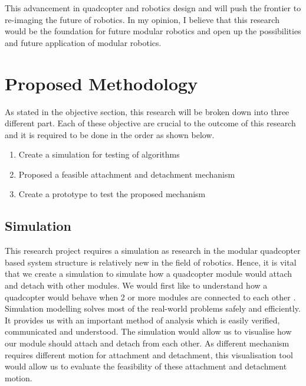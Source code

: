 \documentclass[12pt,A4]{article}
\begin{document}
	This advancement in quadcopter and robotics design and will push the frontier to re-imaging the future of robotics. In my opinion, I believe that this research would be the foundation for future modular robotics and open up the possibilities and future application of modular robotics.\\

	\section{Proposed Methodology}
	
	As stated in the objective section, this research will be broken down into three different part. Each of these objective are crucial to the outcome of this research and it is required to be done in the order as shown below.
	
	\begin{enumerate}
		\item Create a simulation for testing of algorithms
		\item Proposed a feasible attachment and detachment mechanism
		\item Create a prototype to test the proposed mechanism
	\end{enumerate}
	
	\subsection{Simulation}
	
	This research project requires a simulation as research in the modular quadcopter based system structure is relatively new in the field of robotics. Hence, it is vital that we create a simulation to simulate how a quadcopter module would attach and detach with other modules. We would first like to understand how a quadcopter would behave when 2 or more modules are connected to each other \citep{simulation}.\\
	
	Simulation modelling solves most of the real-world problems safely and efficiently. It provides us with an important method of analysis which is easily verified, communicated and understood. The simulation would allow us to visualise how our module should attach and detach from each other. As different mechanism requires different motion for attachment and detachment, this visualisation tool would allow us to evaluate the feasibility of these attachment and detachment motion.\\
	
\end{document}
